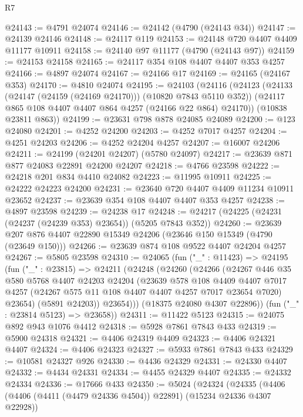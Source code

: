 \begin{lexlean}{R7}
\begin{coremodule}
@24143 := @4791 @24074
@24146 := @24142 (@4790 (@24143 @34))
@24147 := @24139 @24146
@24148 := @24117 @119
@24153 := @24148 @720 @4407 @4409 @11177 @10911
@24158 := @24140 @97 @11177 (@4790 (@24143 @97))
@24159 := @24153 @24158
@24165 := @24117 @354 @108 @4407 @4407 @353 @4257
@24166 := @4897 @24074
@24167 := @24166 @17
@24169 := @24165 (@24167 @353)
@24170 := @4810 @24074
@24195 := @24103
    (@24116
      (@24123
        (@24133 (@24147 (@24159 (@24169 @24170))) (@10820 @7843 @5110 @352))
        (@24117 @865 @108 @4407 @4407 @864 @4257 (@24166 @22 @864) @24170))
      (@10838 @23811 @863))
@24199 := @23631 @798 @878 @24085 @24089
@24200 := @123 @24080
@24201 := @4252 @24200
@24203 := @4252 @7017 @4257
@24204 := @4251 @24203
@24206 := @4252 @24204 @4257
@24207 := @16007 @24206
@24211 := @24199 (@24201 @24207) (@5780 @24097)
@24217 := @23639 @871 @877 @24083 @22891 @24200 @24207
@24218 := @4766 @23598
@24222 := @24218 @201 @834 @4410 @24082
@24223 := @11995 @10911
@24225 := @24222 @24223 @24200
@24231 := @23640 @720 @4407 @4409 @11234 @10911 @23652
@24237 := @23639 @354 @108 @4407 @4407 @353 @4257
@24238 := @4897 @23598
@24239 := @24238 @17
@24248 := @24217 (@24225 (@24231 (@24237 (@24239 @353) @23654)) (@5205 @7843 @352))
@24260 := @23639 @207 @876 @4407 @22890 @15349 @24206 (@23646 @150 @15349 (@4790 (@23649 @150)))
@24266 := @23639 @874 @108 @9522 @4407 @24204 @4257
@24267 := @5805 @23598
@24310 := @24065
    (fun ("_" : @11423) =>
    @24195
      (fun ("_" : @23815) =>
      @24211
        (@24248
          (@24260
            (@24266
              (@24267
                @446
                @35
                @580
                @5768
                @4407
                @24203
                @24204
                (@23639
                  @578
                  @108
                  @4409
                  @4407
                  @7017
                  @4257
                  (@24267 @575 @11 @108 @4407 @4407 @4257 @7017 @23654 @7020)
                  @23654)
                (@5891 @24203))
              @23654)))
        (@18375 @24080 @4307 @22896))
      (fun ("_" : @23814 @5123) => @23658))
@24311 := @11422 @5123
@24315 := @24075 @892 @943 @1076 @4412
@24318 := @5928 @7861 @7843 @433
@24319 := @5900 @24318
@24321 := @4406 @24319 @4409
@24323 := @4406 @24321 @4407
@24324 := @4406 @24323
@24327 := @5933 @7861 @7843 @433
@24329 := @10581 @24327 @926
@24330 := @4436 @24329
@24331 := @24330 @4407
@24332 := @4434 @24331
@24334 := @4455 @24329 @4407
@24335 := @24332 @24334
@24336 := @17666 @433
@24350 := @5024
    (@24324
      (@24335
        (@4406 (@4406 (@4411 (@4479 @24336 @4504)) @22891) (@15234 @24336 @4307 @22928))

\end{coremodule}
\end{lexlean}

